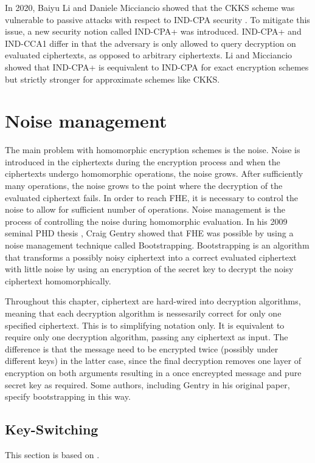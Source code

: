 In 2020, Baiyu Li and Daniele Micciancio showed that the CKKS scheme was vulnerable to passive attacks with respect to IND-CPA security \cite{CKKS-attack}. To mitigate this issue, a new security notion called IND-CPA+ was introduced. IND-CPA+ and IND-CCA1 differ in that the adversary is only allowed to query decryption on evaluated ciphertexts, as opposed to arbitrary ciphertexts. Li and Micciancio showed that IND-CPA+ is eequivalent to IND-CPA for exact encryption schemes but strictly stronger for approximate schemes like CKKS. 

\chapter{Noise management}

The main problem with homomorphic encryption schemes is the noise. Noise is introduced in the ciphertexts during the encryption process and when the ciphertexts undergo homomorphic operations, the noise grows. After sufficiently many operations, the noise grows to the point where the decryption of the evaluated ciphertext fails. In order to reach FHE, it is necessary to control the noise to allow for sufficient number of operations. Noise management is the process of controlling the noise during homomorphic evaluation. In his 2009 seminal PHD thesis \cite{Gentry-Thesis}, Craig Gentry showed that FHE was possible by using a noise management technique called Bootstrapping. Bootstrapping is an algorithm that transforms a possibly noisy ciphertext into a correct evaluated ciphertext with little noise by using an encryption of the secret key to decrypt the noisy ciphertext homomorphically.

Throughout this chapter, ciphertext are hard-wired into decryption algorithms, meaning that each decryption algorithm is nessesarily correct for only one specified ciphertext. This is to simplifying notation only. It is equivalent to require only one decryption algorithm, passing any ciphertext as input. The difference is that the message need to be encrypted twice (possibly under different keys) in the latter case, since the final decryption removes one layer of encryption on both arguments resulting in a once encreypted message and pure secret key as required. Some authors, including Gentry in his original paper, specify bootstrapping in this way. 

\section{Key-Switching}
This section is based on \cite{Bra18-survey}.


